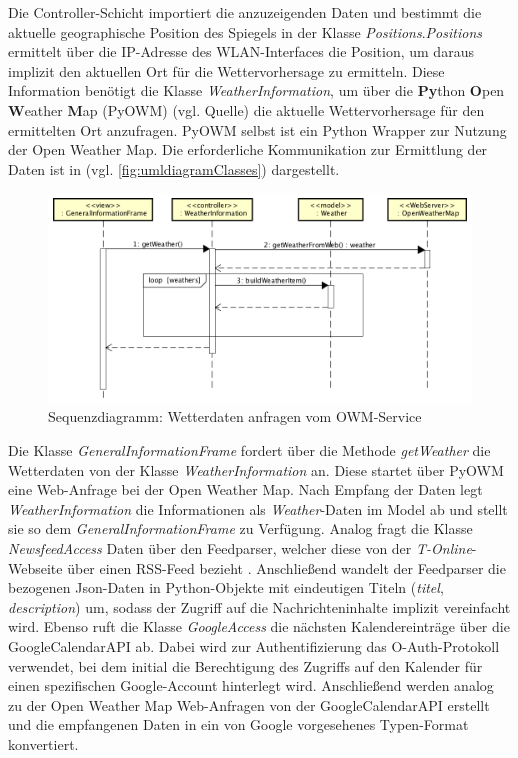 \begin{minipage}{\textwidth}
	
\end{minipage}
 
Die Controller-Schicht importiert die anzuzeigenden Daten und bestimmt die aktuelle geographische Position des Spiegels in der Klasse  \textit{Positions}.\textit{Positions} ermittelt über die IP-Adresse des WLAN-Interfaces die Position, um daraus implizit den aktuellen Ort für die Wettervorhersage zu ermitteln. Diese Information benötigt die Klasse \textit{WeatherInformation}, um über die \textbf{Py}thon \textbf{O}pen \textbf{W}eather \textbf{M}ap (PyOWM) (vgl. Quelle) die aktuelle Wettervorhersage für den ermittelten Ort anzufragen. PyOWM selbst ist ein Python Wrapper zur Nutzung der Open Weather Map. Die erforderliche Kommunikation zur Ermittlung der Daten ist in (vgl. \autoref{fig:umldiagramClasses}) dargestellt.  
 \begin{figure}
 	\centering
 	\includegraphics[width=0.8\linewidth]{bilder/sequenceDiagramGettingData_v2}
 	\caption{Sequenzdiagramm: Wetterdaten anfragen vom OWM-Service}
 	\label{fig:sequenzDiagramData}
 \end{figure}

 Die Klasse \textit{GeneralInformationFrame} fordert über die Methode \textit{getWeather} die Wetterdaten von der Klasse \textit{WeatherInformation} an. Diese startet über PyOWM eine Web-Anfrage bei der Open Weather Map. Nach Empfang der Daten legt \textit{WeatherInformation} die Informationen als \textit{Weather}-Daten im Model ab und stellt sie so dem \textit{GeneralInformationFrame} zu Verfügung. 
 Analog fragt die Klasse \textit{NewsfeedAccess} Daten über den Feedparser, welcher diese von der \textit{T-Online}-Webseite über einen RSS-Feed bezieht \cite{rss}. Anschließend wandelt der Feedparser die bezogenen Json-Daten in Python-Objekte mit eindeutigen Titeln (\textit{titel}, \textit{description}) um, sodass der Zugriff auf die Nachrichteninhalte implizit vereinfacht wird.
 Ebenso ruft die Klasse \textit{GoogleAccess} die nächsten Kalendereinträge über die GoogleCalendarAPI ab. Dabei wird zur Authentifizierung das O-Auth-Protokoll verwendet, bei dem initial die Berechtigung des Zugriffs auf den Kalender für einen spezifischen Google-Account hinterlegt wird. Anschließend werden analog zu der Open Weather Map Web-Anfragen von der GoogleCalendarAPI erstellt und die empfangenen Daten in ein von Google vorgesehenes Typen-Format konvertiert.
 

